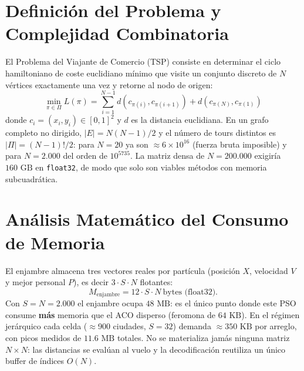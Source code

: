 \documentclass[11pt,a4paper]{article}
\begin{document}
\section{Definición del Problema y Complejidad Combinatoria}
El Problema del Viajante de Comercio (TSP) consiste en determinar el ciclo hamiltoniano de coste euclidiano mínimo que visite un conjunto discreto de $N$ vértices exactamente una vez y retorne al nodo de origen:
\begin{equation}
    \min_{\pi \in \Pi} L(\pi) = \sum_{i=1}^{N-1} d\left(c_{\pi(i)}, c_{\pi(i+1)}\right) + d\left(c_{\pi(N)}, c_{\pi(1)}\right)
\end{equation}
donde $c_i = (x_i, y_i) \in [0, 1]^2$ y $d$ es la distancia euclidiana. En un grafo completo no dirigido, $|E| = N(N-1)/2$ y el número de tours distintos es $|\Pi| = (N-1)!/2$: para $N=20$ ya son $\approx 6\times10^{16}$ (fuerza bruta imposible) y para $N=2.000$ del orden de $10^{5735}$. La matriz densa de $N=200.000$ exigiría $160\text{ GB}$ en \texttt{float32}, de modo que solo son viables métodos con memoria subcuadrática.

\section{Análisis Matemático del Consumo de Memoria}
El enjambre almacena tres vectores reales por partícula (posición $X$, velocidad $V$ y mejor personal $P$), es decir $3\cdot S\cdot N$ flotantes:
\begin{equation}
    M_{\text{enjambre}} = 12\cdot S\cdot N\ \text{bytes (float32)}.
\end{equation}
Con $S=N=2.000$ el enjambre ocupa $48\text{ MB}$: es el único punto donde este PSO consume \textbf{más} memoria que el ACO disperso (feromona de $64\text{ KB}$). En el régimen jerárquico cada celda ($\approx$900 ciudades, $S=32$) demanda $\approx 350\text{ KB}$ por arreglo, con picos medidos de $11{.}6\text{ MB}$ totales. No se materializa jamás ninguna matriz $N\times N$: las distancias se evalúan al vuelo y la decodificación reutiliza un único buffer de índices $O(N)$.

\end{document}
